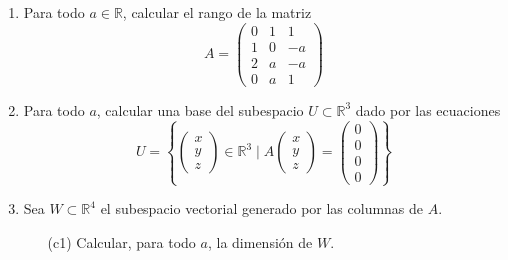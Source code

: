 \documentclass[12pt]{article}
\begin{document}
    \begin{ejercicio}[5 puntos]
        \begin{enumerate}[label=\alph*)]
            \item Para todo $a\in \mathbb{R}$, calcular el rango de la matriz
                \begin{equation*}
                    A = \left(\begin{array}{ccc}
                            0 & 1 & 1 \\
                            1 & 0 & -a \\
                            2 & a & -a \\
                            0 & a & 1
                    \end{array}\right)
                \end{equation*}
            \item Para todo $a$, calcular una base del subespacio $U\subset\mathbb{R}^3$ dado por las ecuaciones
                \begin{equation*}
                    U = \left\{
                        \left(\begin{array}{c}
                            x \\
                            y \\
                            z
                        \end{array}\right)\in \mathbb{R}^3 \mid A
                        \left(\begin{array}{c}
                            x \\
                            y \\
                            z
                        \end{array}\right) = 
                        \left(\begin{array}{c}
                            0 \\
                            0 \\
                            0 \\
                            0 
                        \end{array}\right)
                    \right\}
                \end{equation*}
            \item Sea $W\subset\mathbb{R}^4$ el subespacio vectorial generado por las columnas de $A$.
                \begin{enumerate}
                    \item[(c1)] Calcular, para todo $a$, la dimensión de $W$.

\end{enumerate}
\end{enumerate}
\end{ejercicio}
\end{document}
